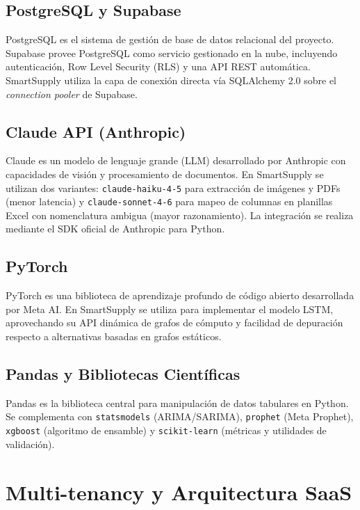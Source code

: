 \documentclass[12pt, a4paper]{report}
\begin{document}
\subsection{PostgreSQL y Supabase}

PostgreSQL es el sistema de gestión de base de datos relacional del proyecto.
Supabase provee PostgreSQL como servicio gestionado en la nube, incluyendo
autenticación, Row Level Security (RLS) y una API REST automática. SmartSupply
utiliza la capa de conexión directa vía SQLAlchemy 2.0 sobre el \textit{connection pooler}
de Supabase.

\subsection{Claude API (Anthropic)}

Claude es un modelo de lenguaje grande (LLM) desarrollado por Anthropic con
capacidades de visión y procesamiento de documentos. En SmartSupply se utilizan
dos variantes: \texttt{claude-haiku-4-5} para extracción de imágenes y PDFs (menor
latencia) y \texttt{claude-sonnet-4-6} para mapeo de columnas en planillas Excel con
nomenclatura ambigua (mayor razonamiento). La integración se realiza mediante el
SDK oficial de Anthropic para Python.

\subsection{PyTorch}

PyTorch es una biblioteca de aprendizaje profundo de código abierto desarrollada por
Meta AI. En SmartSupply se utiliza para implementar el modelo LSTM, aprovechando
su API dinámica de grafos de cómputo y facilidad de depuración respecto a alternativas
basadas en grafos estáticos.

\subsection{Pandas y Bibliotecas Científicas}

Pandas es la biblioteca central para manipulación de datos tabulares en Python. Se
complementa con \texttt{statsmodels} (ARIMA/SARIMA), \texttt{prophet} (Meta Prophet),
\texttt{xgboost} (algoritmo de ensamble) y \texttt{scikit-learn} (métricas y utilidades
de validación).

\section{Multi-tenancy y Arquitectura SaaS}
\end{document}
